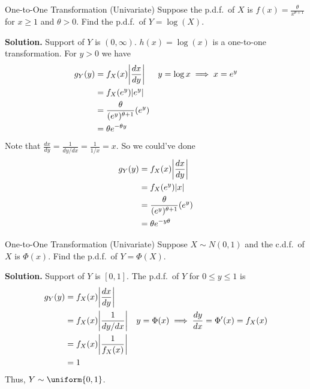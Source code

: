 \begin{Example}{One-to-One Transformation (Univariate)}{}
    Suppose the p.d.f.\ of $ X $ is $ \displaystyle  f(x)=
        \frac{\theta}{x^{\theta+1}} $ for $ x\geqslant 1 $
    and $ \theta>0. $
    Find the p.d.f.\ of $ Y=\log(X) $.

    \textbf{Solution.} Support of $ Y $ is $ (0,\infty) $.
    $ h(x)=\log(x) $
    is a one-to-one transformation. For $ y>0 $ we have
    \begin{align*}
        g_Y(y)
         & =f_X(x)\abs*{\frac{dx}{dy}}           & y=\log x\implies x=e^y \\
         & =f_X(e^y)\abs{e^y}                                             \\
         & =\frac{\theta}{(e^y)^{\theta+1}}(e^y)                          \\
         & =\theta e^{-\theta y}
    \end{align*}
    Note that $ \displaystyle \frac{dx}{dy} =\frac{1}{dy/dx}=\frac{1}{1/x}=x $.
    So we could've done
    \begin{align*}
        g_Y(y)
         & =f_X(x)\abs*{\frac{dx}{dy}}           \\
         & =f_X(e^y)\abs{x}                      \\
         & =\frac{\theta}{(e^y)^{\theta+1}}(e^y) \\
         & =\theta e^{-y\theta}
    \end{align*}
\end{Example}
\begin{Example}{One-to-One Transformation (Univariate)}{}
    Suppose $ X \sim N(0,1) $ and the c.d.f.\ of $ X $ is
    $ \Phi(x) $. Find the p.d.f.\ of $ Y=\Phi(X) $.

    \textbf{Solution.} Support of $ Y $ is $ [0,1] $.
    The p.d.f.\ of $ Y $ for $ 0\leqslant y\leqslant 1 $ is
    \begin{align*}
        g_Y(y)
         & =f_X(x)\abs*{\frac{dx}{dy}}                                       \\
         & =f_X(x)\abs*{\frac{1}{dy/dx}}  & y=\Phi(x)\implies \frac{dy}{dx}=
        \Phi^\prime(x)=f_X(x)                                                \\
         & =f_X(x)\abs*{\frac{1}{f_X(x)}}                                    \\
         & =1
    \end{align*}
    Thus, $ Y \sim \uniform{0,1} $.
\end{Example}
